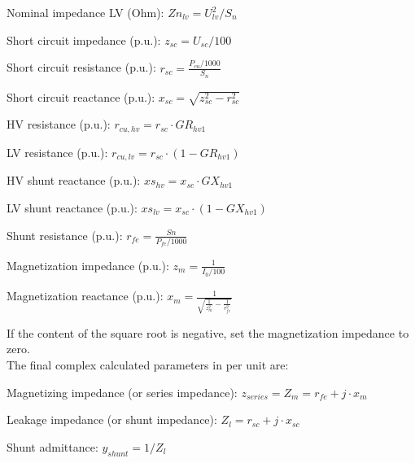 \documentclass[11pt,fleqn]{book} %
\begin{document}
Nominal impedance LV (Ohm): $Zn_{lv} = U_{lv}^2 / S_n$ \newline


Short circuit impedance (p.u.): $z_{sc} = U_{sc} / 100$\newline

Short circuit resistance (p.u.): $r_{sc} = \frac{P_{cu} / 1000}{S_n}$\newline

Short circuit reactance (p.u.): $x_{sc} = \sqrt{z_{sc}^2 - r_{sc} ^2}$\newline


HV resistance (p.u.): $r_{cu,hv} = r_{sc} \cdot GR_{hv1}$\newline


LV resistance (p.u.): $r_{cu,lv} = r_{sc} \cdot (1 - GR_{hv1})$\newline


HV shunt reactance (p.u.): $xs_{hv} = x_{sc} \cdot GX_{hv1}$\newline


LV shunt reactance (p.u.): $xs_{lv} = x_{sc} \cdot (1 - GX_{hv1})$\newline

Shunt resistance (p.u.): $r_{fe} = \frac{Sn}{P_{fe} / 1000}$\newline


Magnetization impedance (p.u.): $z_m = \frac{1}{I_0 / 100}$\newline

Magnetization reactance (p.u.): $x_m = \frac{1}{\sqrt{\frac{1}{z_m^2} - \frac{1}{r_{fe}^2}}}$ \newline

If the content of the square root is negative, set the magnetization impedance to zero.\\


The final complex calculated parameters in per unit are:

Magnetizing impedance (or series impedance): $z_{series} = Z_m = r_{fe} +j \cdot x_m$

Leakage impedance (or shunt impedance): $Z_l = r_{sc} + j \cdot x_{sc}$

Shunt admittance: $y_{shunt} = 1 / Z_l$


\end{document}
